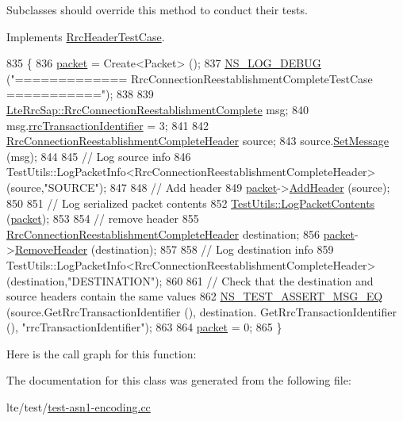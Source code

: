 Subclasses should override this method to conduct their tests. 

Implements \hyperlink{classRrcHeaderTestCase_ab72ac5cd07c4359237c8e36ab16f5414}{Rrc\+Header\+Test\+Case}.


\begin{DoxyCode}
835 \{
836   \hyperlink{classRrcHeaderTestCase_a6f0748c0e845f797497fbda1ca781803}{packet} = Create<Packet> ();
837   \hyperlink{group__logging_ga413f1886406d49f59a6a0a89b77b4d0a}{NS\_LOG\_DEBUG} (\textcolor{stringliteral}{"============= RrcConnectionReestablishmentCompleteTestCase ==========="});
838 
839   \hyperlink{structns3_1_1LteRrcSap_1_1RrcConnectionReestablishmentComplete}{LteRrcSap::RrcConnectionReestablishmentComplete} msg;
840   msg.\hyperlink{structns3_1_1LteRrcSap_1_1RrcConnectionReestablishmentComplete_a3193b6871e5898d5c12d3d35bfbf48ad}{rrcTransactionIdentifier} = 3;
841 
842   \hyperlink{classns3_1_1RrcConnectionReestablishmentCompleteHeader}{RrcConnectionReestablishmentCompleteHeader} source;
843   source.\hyperlink{classns3_1_1RrcConnectionReestablishmentCompleteHeader_a35bbdff43c688be5c3d738dce0835f43}{SetMessage} (msg);
844 
845   \textcolor{comment}{// Log source info}
846   TestUtils::LogPacketInfo<RrcConnectionReestablishmentCompleteHeader> (source,\textcolor{stringliteral}{"SOURCE"});
847 
848   \textcolor{comment}{// Add header}
849   \hyperlink{classRrcHeaderTestCase_a6f0748c0e845f797497fbda1ca781803}{packet}->\hyperlink{classns3_1_1Packet_a465108c595a0bc592095cbcab1832ed8}{AddHeader} (source);
850 
851   \textcolor{comment}{// Log serialized packet contents}
852   \hyperlink{classTestUtils_a9391dac3282094e6e57c0052d88a086f}{TestUtils::LogPacketContents} (\hyperlink{classRrcHeaderTestCase_a6f0748c0e845f797497fbda1ca781803}{packet});
853 
854   \textcolor{comment}{// remove header}
855   \hyperlink{classns3_1_1RrcConnectionReestablishmentCompleteHeader}{RrcConnectionReestablishmentCompleteHeader} destination;
856   \hyperlink{classRrcHeaderTestCase_a6f0748c0e845f797497fbda1ca781803}{packet}->\hyperlink{classns3_1_1Packet_a0961eccf975d75f902d40956c93ba63e}{RemoveHeader} (destination);
857 
858   \textcolor{comment}{// Log destination info}
859   TestUtils::LogPacketInfo<RrcConnectionReestablishmentCompleteHeader> (destination,\textcolor{stringliteral}{"DESTINATION"});
860 
861   \textcolor{comment}{// Check that the destination and source headers contain the same values}
862   \hyperlink{group__testing_ga2a9d78cffb3db8e867c35fff0b698cf5}{NS\_TEST\_ASSERT\_MSG\_EQ} (source.GetRrcTransactionIdentifier (), destination.
      GetRrcTransactionIdentifier (), \textcolor{stringliteral}{"rrcTransactionIdentifier"});
863 
864   \hyperlink{classRrcHeaderTestCase_a6f0748c0e845f797497fbda1ca781803}{packet} = 0;
865 \}
\end{DoxyCode}


Here is the call graph for this function\+:




The documentation for this class was generated from the following file\+:\begin{DoxyCompactItemize}
\item 
lte/test/\hyperlink{test-asn1-encoding_8cc}{test-\/asn1-\/encoding.\+cc}\end{DoxyCompactItemize}
